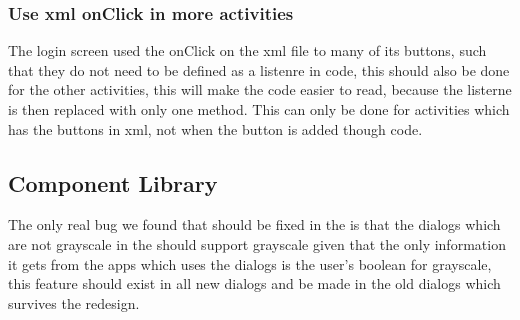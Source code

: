 \subsubsection{Use xml onClick in more activities}
The login screen used the onClick on the xml file to many of its buttons, such
that they do not need to be defined as a listenre in code, this should also be
done for the other activities, this will make the code easier to read, because
the listerne is then replaced with only one method. This can only be done for
activities which has the buttons in xml, not when the button is added though
code.

\subsection{Component Library}
The only real bug we found that should be fixed in the  is
that the dialogs which are not grayscale in the  should support
grayscale given that the only information it gets from the apps which uses the
dialogs is the user's boolean for grayscale, this feature should exist in all
new dialogs and be made in the old dialogs which survives the redesign.

